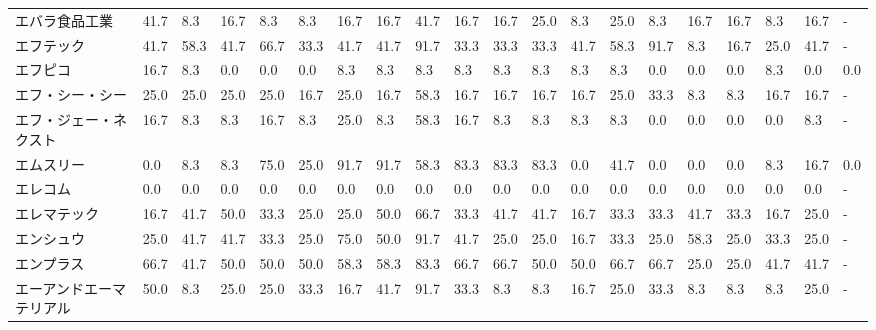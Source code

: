 \documentclass[a4paper，11pt]{jsarticle}
\begin{document}
\begin{longtable}[c]{lp{3mm}p{3mm}p{3mm}p{3mm}p{3mm}p{3mm}p{3mm}p{3mm}p{3mm}p{3mm}p{3mm}p{3mm}p{3mm}p{3mm}p{3mm}p{3mm}p{3mm}p{3mm}p{3mm}}
エバラ食品工業         &   41.7 &    8.3 &      16.7 &       8.3 &        8.3 &   16.7 &   16.7 &   41.7 &    16.7 &    16.7 &   25.0 &   8.3 &   25.0 &     8.3 &    16.7 &  16.7 &   8.3 &  16.7 &     - \\
エフテック           &   41.7 &   58.3 &      41.7 &      66.7 &       33.3 &   41.7 &   41.7 &   91.7 &    33.3 &    33.3 &   33.3 &  41.7 &   58.3 &    91.7 &     8.3 &  16.7 &  25.0 &  41.7 &     - \\
エフピコ            &   16.7 &    8.3 &       0.0 &       0.0 &        0.0 &    8.3 &    8.3 &    8.3 &     8.3 &     8.3 &    8.3 &   8.3 &    8.3 &     0.0 &     0.0 &   0.0 &   8.3 &   0.0 &   0.0 \\
エフ・シー・シー        &   25.0 &   25.0 &      25.0 &      25.0 &       16.7 &   25.0 &   16.7 &   58.3 &    16.7 &    16.7 &   16.7 &  16.7 &   25.0 &    33.3 &     8.3 &   8.3 &  16.7 &  16.7 &     - \\
エフ・ジェー・ネクスト     &   16.7 &    8.3 &       8.3 &      16.7 &        8.3 &   25.0 &    8.3 &   58.3 &    16.7 &     8.3 &    8.3 &   8.3 &    8.3 &     0.0 &     0.0 &   0.0 &   0.0 &   8.3 &     - \\
エムスリー           &    0.0 &    8.3 &       8.3 &      75.0 &       25.0 &   91.7 &   91.7 &   58.3 &    83.3 &    83.3 &   83.3 &   0.0 &   41.7 &     0.0 &     0.0 &   0.0 &   8.3 &  16.7 &   0.0 \\
エレコム            &    0.0 &    0.0 &       0.0 &       0.0 &        0.0 &    0.0 &    0.0 &    0.0 &     0.0 &     0.0 &    0.0 &   0.0 &    0.0 &     0.0 &     0.0 &   0.0 &   0.0 &   0.0 &     - \\
エレマテック          &   16.7 &   41.7 &      50.0 &      33.3 &       25.0 &   25.0 &   50.0 &   66.7 &    33.3 &    41.7 &   41.7 &  16.7 &   33.3 &    33.3 &    41.7 &  33.3 &  16.7 &  25.0 &     - \\
エンシュウ           &   25.0 &   41.7 &      41.7 &      33.3 &       25.0 &   75.0 &   50.0 &   91.7 &    41.7 &    25.0 &   25.0 &  16.7 &   33.3 &    25.0 &    58.3 &  25.0 &  33.3 &  25.0 &     - \\
エンプラス           &   66.7 &   41.7 &      50.0 &      50.0 &       50.0 &   58.3 &   58.3 &   83.3 &    66.7 &    66.7 &   50.0 &  50.0 &   66.7 &    66.7 &    25.0 &  25.0 &  41.7 &  41.7 &     - \\
エーアンドエーマテリアル    &   50.0 &    8.3 &      25.0 &      25.0 &       33.3 &   16.7 &   41.7 &   91.7 &    33.3 &     8.3 &    8.3 &  16.7 &   25.0 &    33.3 &     8.3 &   8.3 &   8.3 &  25.0 &     - \\

\end{longtable}
\end{document}

